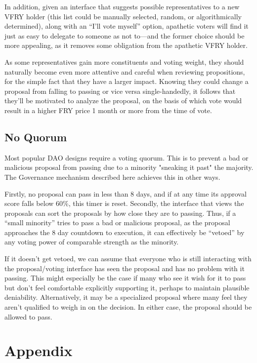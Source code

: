 \documentclass{article}
\begin{document}
In addition, given an interface that suggests possible representatives to a new VFRY holder (this list could be manually selected, random, or algorithmically determined), along with an ``I'll vote myself'' option, apathetic voters will find it just as easy to delegate to someone as not to---and the former choice should be more appealing, as it removes some obligation from the apathetic VFRY holder.

As some representatives gain more constituents and voting weight, they should naturally become even more attentive and careful when reviewing propositions, for the simple fact that they have a larger impact. Knowing they could change a proposal from falling to passing or vice versa single-handedly, it follows that they'll be motivated to analyze the proposal, on the basis of which vote would result in a higher FRY price 1 month or more from the time of vote.

\subsection{No Quorum}

Most popular DAO designs require a voting quorum. This is to prevent a bad or malicious proposal from passing due to a minority "sneaking it past" the majority. The Governance mechanism described here achieves this in other ways.

Firstly, no proposal can pass in less than 8 days, and if at any time its approval score falls below 60\%, this timer is reset. Secondly, the interface that views the proposals can sort the proposals by how close they are to passing. Thus, if a ``small minority'' tries to pass a bad or malicious proposal, as the proposal approaches the 8 day countdown to execution, it can effectively be ``vetoed'' by any voting power of comparable strength as the minority.

If it doesn't get vetoed, we can assume that everyone who is still interacting with the proposal/voting interface has seen the proposal and has no problem with it passing. This might especially be the case if many who see it wish for it to pass but don't feel comfortable explicitly supporting it, perhaps to maintain plausible deniability. Alternatively, it may be a specialized proposal where many feel they aren't qualified to weigh in on the decision. In either case, the proposal should be allowed to pass.

\section{Appendix} \label{appendix}
\end{document}
